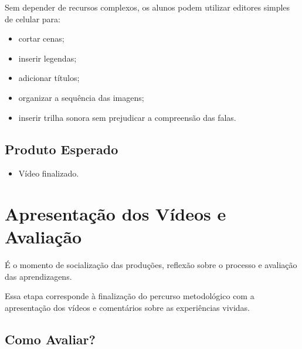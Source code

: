 \documentclass[
  letterpaper,
  DIV=11,
  numbers=noendperiod]{scrreport}
\providecommand{\tightlist}{%
  \setlength{\itemsep}{0pt}\setlength{\parskip}{0pt}}
\begin{document}
\begin{tcolorbox}[enhanced jigsaw, arc=.35mm, bottomrule=.15mm, bottomtitle=1mm, breakable, colback=white, colbacktitle=quarto-callout-tip-color!10!white, colframe=quarto-callout-tip-color-frame, coltitle=black, left=2mm, leftrule=.75mm, opacityback=0, opacitybacktitle=0.6, rightrule=.15mm, title=\textcolor{quarto-callout-tip-color}{\faLightbulb}\hspace{0.5em}{Atividade Prática}, titlerule=0mm, toprule=.15mm, toptitle=1mm]

Sem depender de recursos complexos, os alunos podem utilizar editores
simples de celular para:

\begin{itemize}
\tightlist
\item
  cortar cenas;
\item
  inserir legendas;
\item
  adicionar títulos;
\item
  organizar a sequência das imagens;
\item
  inserir trilha sonora sem prejudicar a compreensão das falas.
\end{itemize}

\subsection{Produto Esperado}\label{produto-esperado-6}

\begin{itemize}
\tightlist
\item
  Vídeo finalizado.
\end{itemize}

\end{tcolorbox}

\section{Apresentação dos Vídeos e
Avaliação}\label{apresentauxe7uxe3o-dos-vuxeddeos-e-avaliauxe7uxe3o}

É o momento de socialização das produções, reflexão sobre o processo e
avaliação das aprendizagens.

Essa etapa corresponde à finalização do percurso metodológico com a
apresentação dos vídeos e comentários sobre as experiências vividas.

\subsection{Como Avaliar?}\label{como-avaliar}
\end{document}
